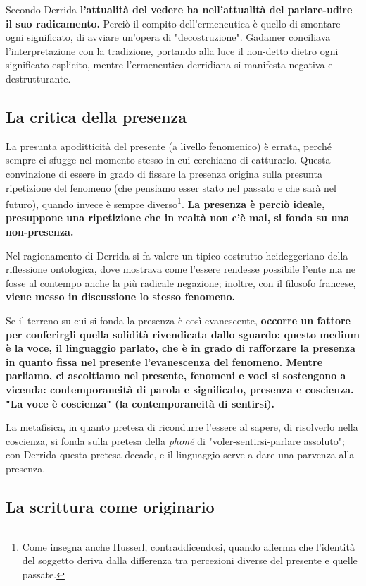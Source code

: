 Secondo Derrida \textbf{l'attualità del vedere ha nell'attualità del parlare-udire il suo radicamento.}
Perciò il compito dell'ermeneutica è quello di
smontare ogni significato, di avviare un'opera di
"decostruzione". Gadamer conciliava l'interpretazione con
la tradizione, portando alla luce il non-detto dietro
ogni significato esplicito, mentre l'ermeneutica
derridiana si manifesta negativa e destrutturante.

\subsection{La critica della presenza}

La presunta apoditticità del presente (a livello
fenomenico) è errata, perché sempre ci sfugge
nel momento stesso in cui cerchiamo di catturarlo.
Questa convinzione di essere in grado di fissare
la presenza origina sulla presunta ripetizione
del fenomeno (che pensiamo esser stato nel passato e che
sarà nel futuro), quando invece è sempre
diverso\footnote{Come insegna anche Husserl, contraddicendosi, quando afferma che l'identità del soggetto deriva
	dalla differenza tra percezioni diverse del presente e quelle
	passate.}. \textbf{La presenza è perciò ideale, presuppone
una ripetizione che in realtà non c'è mai, si
fonda su una non-presenza.}

Nel ragionamento di Derrida si fa valere un
tipico costrutto heideggeriano della riflessione
ontologica, dove mostrava come l'essere rendesse
possibile l'ente ma ne fosse al contempo anche la
più radicale negazione; inoltre, con il filosofo francese, \textbf{viene messo in discussione lo
stesso fenomeno.}

Se il terreno su cui si fonda la presenza è così
evanescente, \textbf{occorre un fattore per conferirgli quella
solidità rivendicata dallo sguardo: questo medium
è la voce, il linguaggio parlato, che è in grado
di rafforzare la presenza in quanto fissa nel
presente l'evanescenza del fenomeno. Mentre
parliamo, ci ascoltiamo nel presente, fenomeni e
voci si sostengono a vicenda: contemporaneità di
parola e significato, presenza e coscienza. "La voce
è coscienza" (la contemporaneità di sentirsi).}

La metafisica, in quanto pretesa di ricondurre
l'essere al sapere, di risolverlo nella coscienza, si
fonda sulla pretesa della \textit{phoné} di "voler-sentirsi-parlare assoluto"; con Derrida questa pretesa decade,
e il linguaggio serve a dare una parvenza alla presenza.

\subsection{La scrittura come originario}

